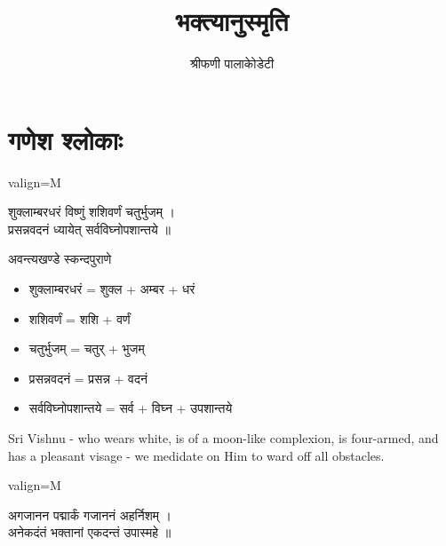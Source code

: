 \documentclass{book}
\title{भक्त्यानुस्मृति}
\author{श्रीफणी पालाकोेडेटी}
\date{}
\newenvironment{Verse}[1][]
  {\bigskip\noindent\begin{center}\begin{adjustbox}{valign=M}\begin{tcolorbox}[colframe=black,colback=white,boxrule=0.5mm,arc=4mm,auto outer arc,left=2mm,right=2mm,top=2mm,bottom=2mm,halign=center]
  \LARGE\bfseries#1\par\varwidth{\linewidth}\centering}
  {\endvarwidth\end{tcolorbox}\end{adjustbox}\end{center}\bigskip}
\begin{document}
\maketitle

\tableofcontents

\chapter{गणेश श्लोकाः}

\begin{Verse}
    शुक्लाम्बरधरं विष्णुं शशिवर्णं चतुर्भुजम् ।\\
    प्रसन्नवदनं ध्यायेत् सर्वविघ्नोपशान्तये ॥
\end{Verse}

\vspace{-2em} %
\begin{center}
    अवन्त्यखण्डे स्कन्दपुराणे
\end{center}
\vspace{2em}

\begin{multicols}{2}
    \setlength{\columnseprule}{0.4pt}
    \begin{itemize}
        \item शुक्लाम्बरधरं = शुक्ल + अम्बर + धरं
        \item शशिवर्णं = शशि + वर्णं
        \item चतुर्भुजम् = चतुर् + भुजम्
        \item प्रसन्नवदनं = प्रसन्न + वदनं
        \item सर्वविघ्नोपशान्तये = सर्व + विघ्न + उपशान्तये
    \end{itemize}

    \columnbreak
    
    \textenglish{
        \noindent Sri Vishnu - who wears white, is of a moon-like complexion, is four-armed,
        and has a pleasant visage - we medidate on Him to ward off all obstacles.
    }

\end{multicols}

\clearpage

\begin{Verse}
    अगजानन पद्मार्कं गजाननं अहर्निशम् ।\\
    अनेकदंतं भक्तानां एकदन्तं उपास्महे ॥
\end{Verse}
\end{document}
